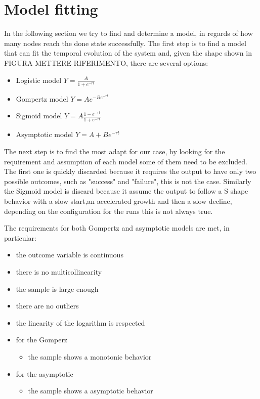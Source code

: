\section{Model fitting}
In the following section we try to find and determine a model, in regards of how many nodes reach the done state successfully. The first step is to find a model that can fit the temporal evolution of the system and, given the shape shown in FIGURA METTERE RIFERIMENTO, there are several options:

\begin{itemize}
	\item Logistic model $ Y = \frac{A}{1 + e^{-rt}} $
	\item Gompertz model $ Y = Ae^{-Be^{-rt}} $
	\item Sigmoid model $ Y = A\frac{1-e^{-rt}}{1+e^{-rt}}$
	\item Asymptotic model $ Y = A + Be^{-rt}$
\end{itemize} 

The next step is to find the most adapt for our case, by looking for the requirement and assumption of each model some of them need to be excluded. The first one is quickly discarded because it requires the output to have only two possible outcomes, such as "success" and "failure", this is not the case.
Similarly the Sigmoid model is discard because it assume the output to follow a S shape behavior with a slow start,an accelerated growth and then a slow decline, depending on the configuration for the runs this is not always true.


The requirements for both Gompertz and asymptotic models are met, in particular:
\begin{itemize}
	\item the outcome variable is continuous
	\item there is no multicollinearity
	\item the sample is large enough
	\item there are no outliers
	\item the linearity of the logarithm is respected
	
	\item for the Gomperz
		\begin{itemize}
			\item the sample shows a monotonic behavior
		\end{itemize}
		\item for the asymptotic
		\begin{itemize}
			\item the sample shows a asymptotic behavior
		\end{itemize}
\end{itemize}

